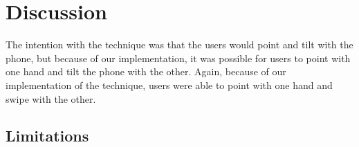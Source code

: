 \section{Discussion}
\label{sec:discussion}

The intention with the \tilt technique was that the users would point and tilt with the phone, but because of our implementation, it was possible for users to point with one hand and tilt the phone with the other.
Again, because of our implementation of the \swipe technique, users were able to point with one hand and swipe with the other.

\subsection{Limitations}